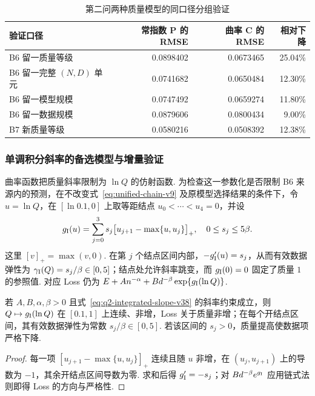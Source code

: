 \begin{table}[htbp]\centering\small
\caption{第二问两种质量模型的同口径分组验证}\label{tab:q2-v26-validation}
\begin{tabular}{lrrr}\toprule
验证口径 & 常指数 P 的 RMSE & 曲率 C 的 RMSE & 相对下降\\\midrule
B6 留一质量等级 & 0.0898402 & 0.0673465 & 25.04\%\\
B6 留一完整 $(N,D)$ 单元 & 0.0741682 & 0.0650484 & 12.30\%\\
B6 留一模型规模 & 0.0747492 & 0.0659274 & 11.80\%\\
B6 留一数据规模 & 0.0879606 & 0.0800434 & 9.00\%\\
B7 新质量等级 & 0.0580216 & 0.0508392 & 12.38\%\\\bottomrule
\end{tabular}
\end{table}


\subsubsection{单调积分斜率的备选模型与增量验证}\label{sec:q2-shape-v38}
曲率函数把质量斜率限制为 $\ln Q$ 的仿射函数. 为检查这一参数化是否限制 B6 来源内的预测，在不改变式~\eqref{eq:unified-chain-v9} 及原模型选择结果的条件下，令 $u=\ln Q$，在 $[\ln0.1,0]$ 上取等距结点 $u_0<\cdots<u_4=0$，并设
\begin{equation}\label{eq:q2-integrated-slope-v38}
g_{\rm I}(u)=\sum_{j=0}^{3}s_j
\bigl[u_{j+1}-\max\{u,u_j\}\bigr]_+,
\quad 0\le s_j\le5\beta.
\end{equation}
这里 $[v]_+=\max(v,0)$. 在第 $j$ 个结点区间内部，$-g_{\rm I}'(u)=s_j$，从而有效数据弹性为 $\gamma_{\rm I}(Q)=s_j/\beta\in[0,5]$；结点处允许斜率跳变，而 $g_{\rm I}(0)=0$ 固定了质量 $1$ 的参照值. 对应 Loss 仍为 $E+An^{-\alpha}+Bd^{-\beta}\exp\{g_{\rm I}(\ln Q)\}$. 

\begin{proposition}[积分斜率质量响应的形状保证]\label{prop:q2-integrated-shape-v38}
若 $A,B,\alpha,\beta>0$ 且式~\eqref{eq:q2-integrated-slope-v38} 的斜率约束成立，则 $Q\mapsto g_{\rm I}(\ln Q)$ 在 $[0.1,1]$ 上连续、非增，Loss 关于质量非增；在每个开结点区间，其有效数据弹性为常数 $s_j/\beta\in[0,5]$. 若该区间的 $s_j>0$，质量提高使数据项严格下降. 
\end{proposition}
\begin{proof}
每一项 $[u_{j+1}-\max\{u,u_j\}]_+$ 连续且随 $u$ 非增，在 $(u_j,u_{j+1})$ 上的导数为 $-1$，其余开结点区间导数为零. 求和后得 $g_{\rm I}'=-s_j$；对 $Bd^{-\beta}e^{g_{\rm I}}$ 应用链式法则即得 Loss 的方向与严格性. 
\end{proof}

